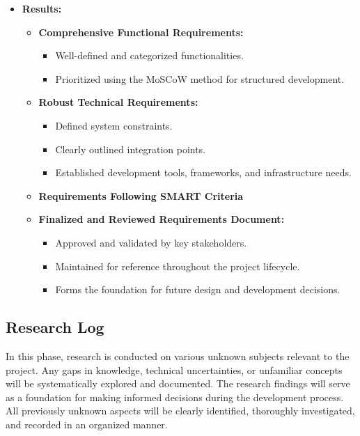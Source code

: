 \documentclass{article}
\begin{document}
\begin{itemize}[leftmargin=*, label={}]
    \item \textbf{Results:}
    \begin{itemize}
        \item \textbf{Comprehensive Functional Requirements:}
        \begin{itemize}
            \item Well-defined and categorized functionalities.
            \item Prioritized using the MoSCoW method for structured development.
        \end{itemize}
        \item \textbf{Robust Technical Requirements:}
        \begin{itemize}
            \item Defined system constraints.
            \item Clearly outlined integration points.
            \item Established development tools, frameworks, and infrastructure needs.
        \end{itemize}
        \item \textbf{Requirements Following SMART Criteria}
        \item \textbf{Finalized and Reviewed Requirements Document:}
        \begin{itemize}
            \item Approved and validated by key stakeholders.
            \item Maintained for reference throughout the project lifecycle.
            \item Forms the foundation for future design and development decisions.
        \end{itemize}
    \end{itemize}
\end{itemize}

\subsection{Research Log}
In this phase, research is conducted on various unknown subjects relevant to the project. Any gaps in knowledge, technical uncertainties, or unfamiliar concepts will be systematically explored and documented. The research findings will serve as a foundation for making informed decisions during the development process. All previously unknown aspects will be clearly identified, thoroughly investigated, and recorded in an organized manner.
\end{document}
